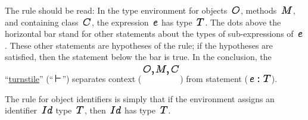 \documentclass[]{article}
\begin{document}
The rule should be read: In the type environment for objects
\includegraphics{img56.png}, methods \includegraphics{img55.png}, and
containing class \includegraphics{img61.png}, the expression
\includegraphics{img51.png} has type \includegraphics{img58.png}. The
dots above the horizontal bar stand for other statements about the types
of sub-expressions of \includegraphics{img51.png}. These other
statements are hypotheses of the rule; if the hypotheses are satisfied,
then the statement below the bar is true. In the conclusion, the
``\href{http://en.wikipedia.org/wiki/Turnstile_\%28symbol\%29}{turnstile}''
(``\includegraphics{img70.png}'') separates context
(\includegraphics{img71.png}) from statement
(\includegraphics{img72.png}).

The rule for object identifiers is simply that if the environment
assigns an identifier \includegraphics{img73.png} type
\includegraphics{img58.png}, then \includegraphics{img73.png} has type
\includegraphics{img58.png}. \\
\end{document}
